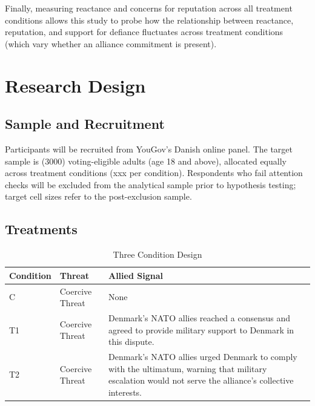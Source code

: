 Finally, measuring reactance and concerns for reputation across all treatment conditions allows this study to probe how the relationship between reactance, reputation, and support for defiance fluctuates across treatment conditions (which vary whether an alliance commitment is present). 

\section{Research Design}
\label{sec:designB}

\subsection{Sample and Recruitment}

Participants will be recruited from YouGov's Danish online panel. The target sample is (3000) voting-eligible adults (age 18 and above), allocated equally across treatment conditions (xxx per condition). Respondents who fail attention checks will be excluded from the analytical sample prior to hypothesis testing; target cell sizes refer to the post-exclusion sample.

\subsection{Treatments}
\begin{table}[H]
\centering
\caption{Three Condition Design}
\label{tab:studyb_treatments}
\footnotesize
\begin{tabular}{p{3cm} p{3cm} p{8cm}}
\toprule
\textbf{Condition} & \textbf{Threat} & \textbf{Allied Signal} \\
\midrule
C & Coercive Threat & None \\ 
T1 & Coercive Threat & Denmark's NATO allies reached a consensus and agreed to provide military support to Denmark in this dispute. \\
T2 & Coercive Threat & Denmark's NATO allies urged Denmark to comply with the ultimatum, warning that military escalation would not serve the alliance's collective interests. \\
\bottomrule
\end{tabular}
\end{table}


